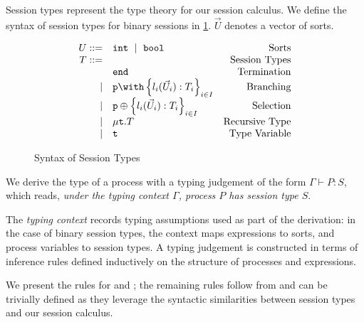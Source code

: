 {Session types} represent the type theory for our session calculus.
We define the syntax of session types for binary sessions in
\cref{fig:bst}. $\vec U$ denotes a vector of sorts.

\begin{figure}[!hb]
\doublespacing
\[
\begin{array}{rlr}

U ::= & \text{\tt{int}}~\mid~\text{\tt{bool}} & \text{Sorts} \\

T ::= & & \text{Session Types} \\
     & \tend & \text{Termination} \\
\mid & \tbra{p}{l_i(\vec U_i):T_i}{i\in I} & \text{Branching} \\
\mid & \tsel{p}{l_i(\vec U_i):T_i}{i\in I} & \text{Selection} \\
\mid & \trec{T} & \text{Recursive Type} \\
\mid & \trecvar & \text{Type Variable} \\
\end{array}
\]

\singlespacing
\caption{Syntax of Session Types}
\label{fig:bst}
\end{figure}

We derive the type of a process with a {typing judgement} 
of the form $\Gamma \vdash P: S$, which reads, 
\textit{under the typing context $\Gamma$, 
process $P$ has session type $S$}. 

The \textit{typing context} records typing assumptions 
used as part of the derivation: in the case of binary session types, 
the context maps expressions to sorts, 
and process variables to session types. 
A typing judgement is constructed in terms of inference rules 
defined inductively on the structure of 
processes and expressions.

We present the rules for  and ; 
the remaining rules follow from \cite{C406Lecture} 
and can be trivially defined as 
they leverage the syntactic similarities between 
session types and our session calculus.

\begin{prooftree}
\end{prooftree}

